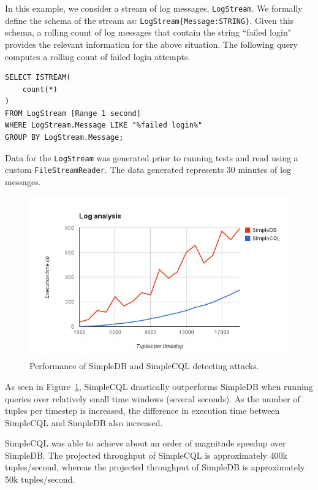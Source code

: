 \documentclass[a4paper, 10pt, conference]{IEEEconf}
\begin{document}
In this example, we consider a stream of log messages, \texttt{LogStream}. We formally define the schema of the stream as: \texttt{LogStream\{Message:STRING\}}. Given this schema, a rolling count of log messages that contain the string ``failed login" provides the relevant information for the above situation.  The following query computes a rolling count of failed login attempts.

\begin{verbatim}
SELECT ISTREAM(
    count(*)
)
FROM LogStream [Range 1 second]
WHERE LogStream.Message LIKE "%failed login%"
GROUP BY LogStream.Message;
\end{verbatim}

Data for the \texttt{LogStream} was generated prior to running tests and read using a custom \texttt{FileStreamReader}.  The data generated represents 30 minutes of log messages.

\begin{figure}[tpH!]
    \centering
    \centerline{\includegraphics[totalheight=5cm]{attack.png}}
    \caption{Performance of SimpleDB and SimpleCQL detecting attacks.}
    \label{fig:attack}
\end{figure}

As seen in Figure~\ref{fig:attack}, SimpleCQL drastically outperforms SimpleDB when running queries over relatively small time windows (several seconds).  As the number of tuples per timestep is increased, the difference in execution time between SimpleCQL and SimpleDB also increased.  

SimpleCQL was able to achieve about an order of magnitude speedup over SimpleDB.  The projected throughput of SimpleCQL is approximately 400k tuples/second, whereas the projected throughput of SimpleDB is approximately 50k tuples/second.
\end{document}
